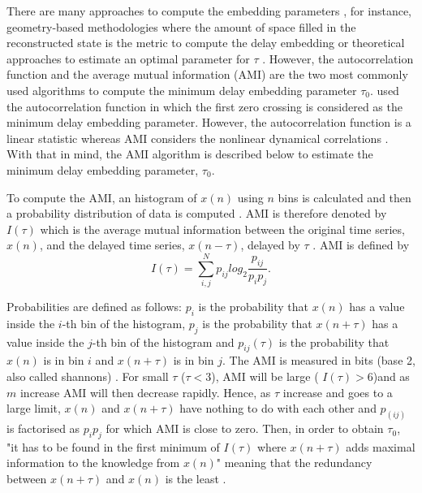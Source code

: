 There are many approaches to compute the embedding parameters 
\citep{bradley2015}, for instance, geometry-based methodologies where 
the amount of space filled in the reconstructed state is the metric to 
compute the delay embedding \citep{mrosenstein1994} or 
theoretical approaches to estimate an optimal parameter for 
$\tau$ \cite{casdagli1991}. 
However, the autocorrelation function and the average mutual information 
(AMI) are the two most commonly used algorithms to compute the minimum 
delay embedding parameter $\tau_0$. \cite{emrani2014a} used the 
autocorrelation function in which the first zero crossing is considered 
as the minimum delay embedding parameter. However, the autocorrelation 
function is a linear statistic whereas AMI considers the nonlinear 
dynamical correlations \citep{afraser1986,krakovska2015}.
With that in mind, the AMI algorithm is described below to estimate 
the minimum delay embedding parameter, \texorpdfstring{$\tau_0$}{T}.

To compute the AMI, an histogram of $x(n)$ using $n$ bins is calculated
and then a probability distribution of data is computed \citep{kantz2003}.
AMI is therefore denoted by $I(\tau)$ which is the average mutual 
information between the original time series, $x(n)$, and the delayed time 
series, $x(n-\tau)$, delayed by $\tau$ \citep{kabiraj2012}. AMI is defined by
\begin{equation}\label{eq:ami}
I(\tau) = \sum_{i,j}^N p_{ij} log_2 \frac{ p_{ij} }{ p_i p_j }.
\end{equation}

Probabilities are defined as follows: 
$p_i$ is the probability that $x(n)$ has a value inside the $i$-th bin of 
the histogram, $p_j$ is the probability that $x(n+\tau)$ has a value inside 
the $j$-th bin of the histogram and $p_{ij}(\tau)$ is the probability 
that $x(n)$ is in bin $i$ and $x(n+\tau)$ is in bin $j$.
The AMI is measured in bits (base 2, also called shannons) 
\citep{kantz2003, nonlinearTseries2016}.
For small $\tau$ ($\tau < 3$), AMI will be large ( $I(\tau)>6$)and as 
$m$ increase AMI will then decrease rapidly. Hence, as $\tau$ increase 
and goes to a large limit, $x(n)$ and $x(n+\tau)$ have 
nothing to do with each other and $p_(ij)$ is factorised as $p_ip_j$ for 
which AMI is close to zero.  Then, in order to obtain $\tau_0$, 
"it has to be found in the first minimum of $I(\tau)$ where $x(n+\tau)$ 
adds maximal information to the knowledge from $x(n)$" meaning that the 
redundancy between $x(n+\tau)$ and $x(n)$ is the least
\citep[p. 151]{kantz2003}.


